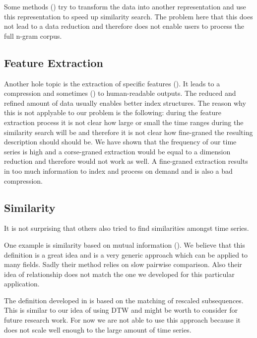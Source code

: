Some methods (\cite{dimred3,dimred4}) try to transform the data into another representation and use this representation to speed up similarity search. The problem here that this does not lead to a data reduction and therefore does not enable users to process the full n-gram corpus.


\subsection{Feature Extraction}
\label{ssec:baseline:prior:extract}

Another hole topic is the extraction of specific features (\cite{compress1,compress2,compress3,compress4,compress5}). It leads to a compression and sometimes (\cite{compress1}) to human-readable outputs. The reduced and refined amount of data usually enables better index structures. The reason why this is not applyable to our problem is the following: during the feature extraction process it is not clear how large or small the time ranges during the similarity search will be and therefore it is not clear how fine-graned the resulting description should should be. We have shown that the frequency of our time series is high and a corse-graned extraction would be equal to a dimension reduction and therefore would not work as well. A fine-graned extraction results in too much information to index and process on demand and is also a bad compression.


\subsection{Similarity}
\label{ssec:baseline:prior:sim}

It is not surprising that others also tried to find similarities amongst time series.

One example is similarity based on mutual information (\cite{MISE}). We believe that this definition is a great idea and is a very generic approach which can be applied to many fields. Sadly their method relies on slow pairwise comparison. Also their idea of relationship does not match the one we developed for this particular application.

The definition developed in \cite{sim1} is based on the matching of rescaled subsequences. This is similar to our idea of using DTW and might be worth to consider for future research work. For now we are not able to use this approach because it does not scale well enough to the large amount of time series.

